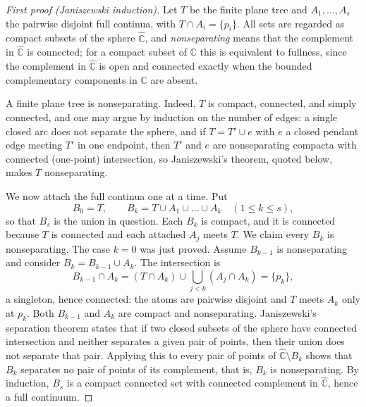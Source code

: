 \documentclass[11pt,reqno]{amsart}
\theoremstyle{definition}
\theoremstyle{remark}
\newcommand{\C}{\mathbb C}
\newcommand{\Chat}{\widehat{\mathbb C}}
\begin{document}
\begin{proof}[First proof (Janiszewski induction)]
Let $T$ be the finite plane tree and $A_1,\dots,A_s$ the pairwise disjoint
full continua, with $T\cap A_i=\{p_i\}$.  All sets are regarded as compact
subsets of the sphere $\Chat$, and \emph{nonseparating} means that the
complement in $\Chat$ is connected; for a compact subset of $\C$ this is
equivalent to fullness, since the complement in $\Chat$ is open and
connected exactly when the bounded complementary components in $\C$ are
absent.

A finite plane tree is nonseparating.  Indeed, $T$ is compact, connected,
and simply connected, and one may argue by induction on the number of
edges: a single closed arc does not separate the sphere, and if
$T=T'\cup e$ with $e$ a closed pendant edge meeting $T'$ in one endpoint,
then $T'$ and $e$ are nonseparating compacta with connected (one-point)
intersection, so Janiszewski's theorem, quoted below, makes $T$
nonseparating.

We now attach the full continua one at a time.  Put
\[
B_0=T,\qquad B_k=T\cup A_1\cup\dots\cup A_k\quad(1\le k\le s),
\]
so that $B_s$ is the union in question.  Each $B_k$ is compact, and it is
connected because $T$ is connected and each attached $A_j$ meets $T$.  We
claim every $B_k$ is nonseparating.  The case $k=0$ was just proved.
Assume $B_{k-1}$ is nonseparating and consider $B_k=B_{k-1}\cup A_k$.
The intersection is
\[
B_{k-1}\cap A_k
=(T\cap A_k)\cup\bigcup_{j<k}(A_j\cap A_k)
=\{p_k\},
\]
a singleton, hence connected: the atoms are pairwise disjoint and $T$
meets $A_k$ only at $p_k$.  Both $B_{k-1}$ and $A_k$ are compact and
nonseparating.  Janiszewski's separation theorem
\cite{New51,Why42} states that if two closed subsets of the sphere have
connected intersection and neither separates a given pair of points, then
their union does not separate that pair.  Applying this to every pair of
points of $\Chat\setminus B_k$ shows that $B_k$ separates no pair of
points of its complement, that is, $B_k$ is nonseparating.  By induction,
$B_s$ is a compact connected set with connected complement in $\Chat$,
hence a full continuum.
\end{proof}
\end{document}
